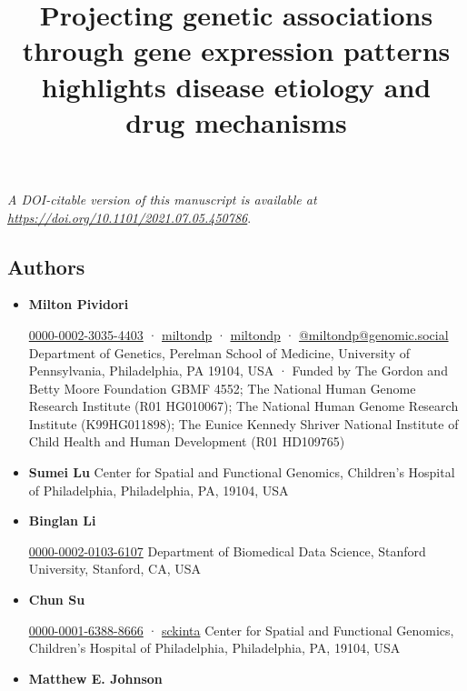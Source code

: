 \documentclass[
]{article}
\title{Projecting genetic associations through gene expression patterns highlights disease etiology and drug mechanisms}
\author{}
\date{}
\begin{document}
\maketitle

\emph{A DOI-citable version of this manuscript is available at \url{https://doi.org/10.1101/2021.07.05.450786}}.

\hypertarget{authors}{%
\subsection{Authors}\label{authors}}

\begin{itemize}
\item
  \textbf{Milton Pividori}
  
  \href{https://orcid.org/0000-0002-3035-4403}{0000-0002-3035-4403}
  · 
  \href{https://github.com/miltondp}{miltondp}
  · 
  \href{https://twitter.com/miltondp}{miltondp}
  · 
  \href{https://genomic.social/@miltondp}{@miltondp@genomic.social}
  Department of Genetics, Perelman School of Medicine, University of Pennsylvania, Philadelphia, PA 19104, USA
  · Funded by The Gordon and Betty Moore Foundation GBMF 4552; The National Human Genome Research Institute (R01 HG010067); The National Human Genome Research Institute (K99HG011898); The Eunice Kennedy Shriver National Institute of Child Health and Human Development (R01 HD109765)
\item
  \textbf{Sumei Lu}
  Center for Spatial and Functional Genomics, Children's Hospital of Philadelphia, Philadelphia, PA, 19104, USA
\item
  \textbf{Binglan Li}
  
  \href{https://orcid.org/0000-0002-0103-6107}{0000-0002-0103-6107}
  Department of Biomedical Data Science, Stanford University, Stanford, CA, USA
\item
  \textbf{Chun Su}
  
  \href{https://orcid.org/0000-0001-6388-8666}{0000-0001-6388-8666}
  · 
  \href{https://github.com/sckinta}{sckinta}
  Center for Spatial and Functional Genomics, Children's Hospital of Philadelphia, Philadelphia, PA, 19104, USA
\item
  \textbf{Matthew E. Johnson}

\end{itemize}
\end{document}
